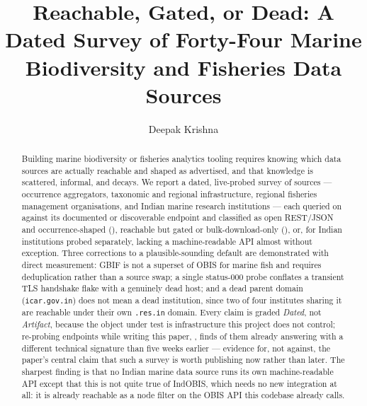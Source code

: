 \documentclass[runningheads]{llncs}
\begin{document}
\title{Reachable, Gated, or Dead: A Dated Survey of Forty-Four Marine
Biodiversity and Fisheries Data Sources}


\author{Deepak Krishna}

\maketitle

\begin{abstract}
Building marine biodiversity or fisheries analytics tooling requires knowing
which data sources are actually reachable and shaped as advertised, and that
knowledge is scattered, informal, and decays. We report a dated, live-probed
survey of \NSourcesSurveyed{} sources --- occurrence aggregators, taxonomic
and regional infrastructure, regional fisheries management organisations,
and Indian marine research institutions --- each queried on \ProbeDate{}
against its documented or discoverable endpoint and classified as open
REST/JSON and occurrence-shaped (\NTierOne{}), reachable but gated or
bulk-download-only (\NTierTwo{}), or, for \NTierThree{} Indian institutions
probed separately, lacking a machine-readable API almost without exception.
Three corrections to a plausible-sounding default are demonstrated with
direct measurement: GBIF is not a superset of OBIS for marine fish and
requires deduplication rather than a source swap; a single status-000 probe
conflates a transient TLS handshake flake with a genuinely dead host; and a
dead parent domain (\texttt{icar.gov.in}) does not mean a dead institution,
since two of four institutes sharing it are reachable under their own
\texttt{.res.in} domain. Every claim is graded \emph{Dated}, not
\emph{Artifact}, because the object under test is infrastructure this
project does not control; re-probing \NEndpointsReprobed{} endpoints while
writing this paper, \AsOf{}, finds \NEndpointsDrifted{} of them already
answering with a different technical signature than five weeks earlier ---
evidence for, not against, the paper's central claim that such a survey is
worth publishing now rather than later. The sharpest finding is that no
Indian marine data source runs its own machine-readable API except that this
is not quite true of IndOBIS, which needs no new integration at all: it is
already reachable as a node filter on the OBIS API this codebase already
calls.
\end{abstract}
\end{document}
